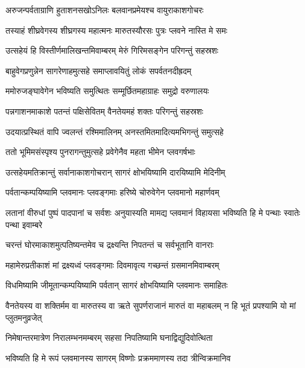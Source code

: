 \twolineshloka
{अरुजन्पर्वताग्राणि हुताशनसखोऽनिलः}
{बलवानप्रमेयश्च वायुराकाशगोचरः} %

\twolineshloka
{तस्याहं शीघ्रवेगस्य शीघ्रगस्य महात्मनः}
{मारुतस्यौरसः पुत्रः प्लवने नास्ति मे समः} %

\twolineshloka
{उत्सहेयं हि विस्तीर्णमालिखन्तमिवाम्बरम्}
{मेरुं गिरिमसङ्गेन परिगन्तुं सहस्रशः} %

\twolineshloka
{बाहुवेगप्रणुन्नेन सागरेणाहमुत्सहे}
{समाप्लावयितुं लोकं सपर्वतनदीह्रदम्} %

\twolineshloka
{ममोरुजङ्घावेगेन भविष्यति समुत्थितः}
{सम्मूर्छितमहाग्राहः समुद्रो वरुणालयः} %

\twolineshloka
{पन्नगाशनमाकाशे पतन्तं पक्षिसेवितम्}
{वैनतेयमहं शक्तः परिगन्तुं सहस्रशः} %

\twolineshloka
{उदयात्प्रस्थितं वापि ज्वलन्तं रश्मिमालिनम्}
{अनस्तमितमादित्यमभिगन्तुं समुत्सहे} %

\twolineshloka
{ततो भूमिमसंस्पृश्य पुनरागन्तुमुत्सहे}
{प्रवेगेनैव महता भीमेन प्लवगर्षभाः} %

\twolineshloka
{उत्सहेयमतिक्रान्तुं सर्वानाकाशगोचरान्}
{सागरं क्षोभयिष्यामि दारयिष्यामि मेदिनीम्} %

\twolineshloka
{पर्वतान्कम्पयिष्यामि प्लवमानः प्लवङ्गमाः}
{हरिष्ये चोरुवेगेन प्लवमानो महार्णवम्} %

\threelineshloka
{लतानां वीरुधां पुष्पं पादपानां च सर्वशः}
{अनुयास्यति मामद्य प्लवमानं विहायसा}
{भविष्यति हि मे पन्थाः स्वातेः पन्था इवाम्बरे} %

\twolineshloka
{चरन्तं घोरमाकाशमुत्पतिष्यन्तमेव च}
{द्रक्ष्यन्ति निपतन्तं च सर्वभूतानि वानराः} %

\twolineshloka
{महामेरुप्रतीकाशं मां द्रक्ष्यध्वं प्लवङ्गमाः}
{दिवमावृत्य गच्छन्तं ग्रसमानमिवाम्बरम्} %

\twolineshloka
{विधमिष्यामि जीमूतान्कम्पयिष्यामि पर्वतान्}
{सागरं क्षोभयिष्यामि प्लवमानः समाहितः} %

\threelineshloka
{वैनतेयस्य वा शक्तिर्मम वा मारुतस्य वा}
{ऋते सुपर्णराजानं मारुतं वा महाबलम्}
{न हि भूतं प्रपश्यामि यो मां प्लुतमनुव्रजेत्} %

\twolineshloka
{निमेषान्तरमात्रेण निरालम्भनमम्बरम्}
{सहसा निपतिष्यामि घनाद्विद्युदिवोत्थिता} %

\twolineshloka
{भविष्यति हि मे रूपं प्लवमानस्य सागरम्}
{विष्णोः प्रक्रममाणस्य तदा त्रीन्विक्रमानिव} %

